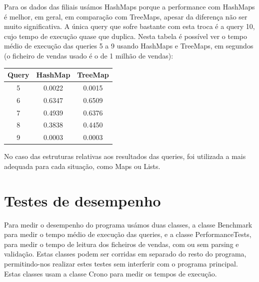 \documentclass[a4paper]{report}
\begin{document}
	Para os dados das filiais usámos HashMaps porque a performance com HashMaps é melhor, em geral, em comparação com TreeMaps, apesar da diferença não ser muito significativa. A única query que sofre bastante com esta troca é a query 10, cujo tempo de execução quase que duplica. Nesta tabela é possível ver o tempo médio de execução das queries 5 a 9 usando HashMaps e TreeMaps, em segundos (o ficheiro de vendas usado é o de 1 milhão de vendas):\\
	\begin{center}
	\begin{tabular}[pos]{| c | c | c |}
		\hline
		Query & HashMap & TreeMap \\ \hline
		5 & 0.0022 & 0.0015 \\ \hline
		6 & 0.6347 & 0.6509 \\ \hline
		7 & 0.4939 & 0.6376 \\ \hline
		8 & 0.3838 & 0.4450 \\ \hline
		9 & 0.0003 & 0.0003 \\ \hline
	\end{tabular}
	\end{center}
	
	No caso das estruturas relativas aos resultados das queries, foi utilizada a mais adequada para cada situação, como Maps ou Lists.

	\chapter{Testes de desempenho}
	
	Para medir o desempenho do programa usámos duas classes, a classe Benchmark para medir o tempo médio de execução das queries, e a classe PerformanceTests, para medir o tempo de leitura dos ficheiros de vendas, com ou sem parsing e validação. Estas classes podem ser corridas em separado do resto do programa, permitindo-nos realizar estes testes sem interferir com o programa principal. Estas classes usam a classe Crono para medir os tempos de execução.
	
\end{document}
